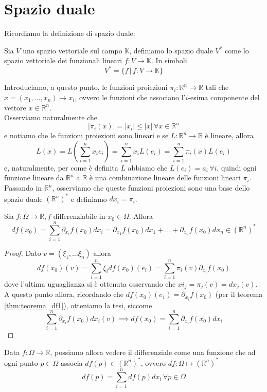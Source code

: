 \documentclass[openany]{book}
\begin{document}
\section{Spazio duale}
Ricordiamo la definizione di spazio duale:
\begin{definition}
Sia $V$ uno spazio vettoriale sul campo $\mathbb{K}$, definiamo lo spazio duale $V^{*}$ come lo spazio vettoriale dei funzionali lineari $f: V \to \mathbb{K}$. In simboli
$$
V^{*} = \{f \, | \, f: V \to \mathbb{K} \}
$$
\end{definition}
\noindent Introduciamo, a questo punto, le funzioni proiezioni $\pi_i: \mathbb{R}^n \to \mathbb{R}$ tali che $x = (x_1, \ldots, x_n) \mapsto x_i$, ovvero le funzioni che associano l'$i$-esima componente del vettore $x \in \mathbb{R}^n$. \\
Osserviamo naturalmente che
$$
|\pi_i(x)| = |x_i| \leq |x| \, \forall x \in \mathbb{R}^n
$$ 
e notiamo che le funzioni proiezioni sono lineari e se $L: \mathbb{R}^n \to \mathbb{R}$ è lineare, allora
$$
L(x) = L \left( \sum_{i=1}^n x_i e_i \right) = \sum_{i=1}^n x_i L(e_i) = \sum_{i=1}^n \pi_i(x) L(e_i)
$$
e, naturalmente, per come è definita $L$ abbiamo che $L(e_i) = a_i \, \forall i$, quindi ogni funzione lineare da $\mathbb{R}^n$ a $\mathbb{R}$ è una combinazione lineare delle funzioni lineari $\pi_i$. \\
Passando in $\mathbb{R}^n$, osserviamo che queste funzioni proiezioni sono una base dello spazio duale $(\mathbb{R}^n)^{*}$ e definiamo $dx_i = \pi_i$. \\
\begin{prop}
Sia $f: \Omega \to \mathbb{R}, f$ differenziabile in $x_0 \in \Omega$. Allora
$$
df(x_0) = \sum_{i=1}^n \partial_{x_i} f(x_0)dx_i = \partial_{x_1} f(x_0)dx_1 + \ldots + \partial_{x_n} f(x_0)dx_n \in (\mathbb{R}^n)^{*}
$$
\end{prop}
\begin{proof}
Dato $v=(\xi_1, \ldots \xi_n)$ allora
$$
df(x_0)(v) = \sum_{i=1}^n \xi_i df(x_0)(e_i) = \sum_{i=1}^n \pi_i(v) \partial_{x_i} f(x_0)$$
dove l'ultima uguaglianza si è ottenuta osservando che $xi_j = \pi_j(v) = dx_j(v)$. A questo punto allora, ricordando che $df(x_0)(e_1) = \partial_{x_i} f(x_0)$ (per il teorema \ref{thm:teorema_df1}), otteniamo la tesi, siccome
$$\sum_{i=1}^n \partial_{x_i} f(x_0) dx_i(v) \implies df(x_0) = \sum_{i=1}^n \partial_{x_i} f(x_0) dx_i
$$
\end{proof}
\begin{remark}
Data $f: \Omega \to \mathbb{R}$, possiamo allora vedere il differenziale come una funzione che ad ogni punto $p \in \Omega$ associa $df(p) \in (\mathbb{R}^n)^{*}$, ovvero $df: \Omega \mapsto (\mathbb{R}^n)^{*}$
$$
df(p) = \sum_{i=1}^n df(p)dx_i \, \forall p \in \Omega
$$
\end{remark}
\end{document}
